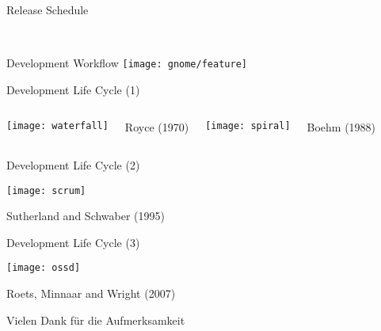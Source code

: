 \documentclass[11pt]{beamer}
\begin{document}
\begin{frame}{Release Schedule}
  \vspace{-1.4em}
\begin{figure}[htbp]
  \centering
   \\

\end{figure}
\end{frame}

\begin{frame}{Development Workflow}
  \texttt{[image: gnome/feature]}
\end{frame}


\begin{frame}{Development Life Cycle (1)}
  \begin{center}
  \begin{columns}
  \texttt{[image: waterfall]}

  {\tiny\hfill
  Royce (1970)
  }

  \texttt{[image: spiral]}

  {\tiny\hfill
  Boehm (1988)
  }

  \end{columns}
  \end{center}
\end{frame}

\begin{frame}{Development Life Cycle (2)}
  \begin{center}

    \texttt{[image: scrum]}

    {\tiny\hfill
    Sutherland and Schwaber (1995)
    }
  \end{center}
\end{frame}

\begin{frame}{Development Life Cycle (3)}
  \begin{center}
    \texttt{[image: ossd]}

    {\tiny\hfill
    Roets, Minnaar and Wright (2007)
    }
  \end{center}
\end{frame}

\begin{frame}
  \begin{center}
  {\Huge Vielen Dank für die Aufmerksamkeit}
  \end{center}
\end{frame}
\end{document}
